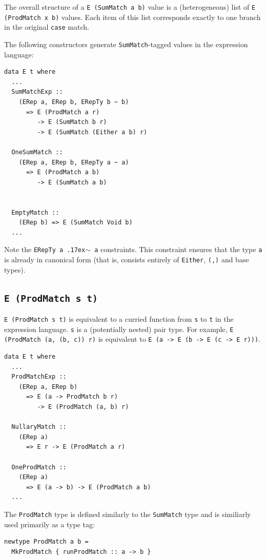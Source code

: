 \documentclass[sigplan,anonymous,review]{acmart}
\newcommand{\typeeq}{\raise.17ex\hbox{$\scriptstyle\mathtt{\sim}$}\,\;}
\newcommand{\ttt}{\texttt}
\begin{document}
The overall structure of a \ttt{E (SumMatch a b)} value is a (heterogeneous)
list of \ttt{E (ProdMatch x b)} values.  Each item of this list corresponds
exactly to one branch in the original \ttt{case} match.

The following constructors generate \ttt{SumMatch}-tagged values in the
expression language:

\newpage
\begin{lstlisting}
data E t where
  ...
  SumMatchExp ::
    (ERep a, ERep b, ERepTy b ~ b)
      => E (ProdMatch a r)
         -> E (SumMatch b r)
         -> E (SumMatch (Either a b) r)

  OneSumMatch ::
    (ERep a, ERep b, ERepTy a ~ a)
      => E (ProdMatch a b)
         -> E (SumMatch a b)


  EmptyMatch ::
    (ERep b) => E (SumMatch Void b)
  ...
\end{lstlisting}

Note the \ttt{ERepTy a \typeeq a} constraints. This constraint ensures that the type
\ttt{a} is already in canonical form (that is, consists entirely of
\ttt{Either}, \ttt{(,)} and base types).

\subsection{\ttt{E (ProdMatch s t)}}

\ttt{E (ProdMatch s t)} is equivalent to a curried function from \ttt{s} to
\ttt{t} in the expression language.  \ttt{s} is a (potentially
nested) pair type. For example, \ttt{E (ProdMatch (a, (b, c)) r)} is
equivalent to \ttt{E (a -> E (b -> E (c -> E r)))}.

\begin{lstlisting}
data E t where
  ...
  ProdMatchExp ::
    (ERep a, ERep b)
      => E (a -> ProdMatch b r)
         -> E (ProdMatch (a, b) r)

  NullaryMatch ::
    (ERep a)
      => E r -> E (ProdMatch a r)

  OneProdMatch ::
    (ERep a)
      => E (a -> b) -> E (ProdMatch a b)
  ...
\end{lstlisting}

The \ttt{ProdMatch} type is defined similarly to the \ttt{SumMatch} type and is
similiarly used primarily as a type tag:

\begin{lstlisting}
newtype ProdMatch a b =
  MkProdMatch { runProdMatch :: a -> b }
\end{lstlisting}
\end{document}
